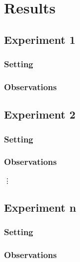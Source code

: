 \documentclass[11pt]{article}
\begin{document}
\section{Results}

\subsection{Experiment 1}

\subsubsection{Setting}
	
\subsubsection{Observations}

\subsection{Experiment 2}

\subsubsection{Setting}

\subsubsection{Observations}

\vdots

\subsection{Experiment n}

\subsubsection{Setting}

\subsubsection{Observations}
\end{document}
